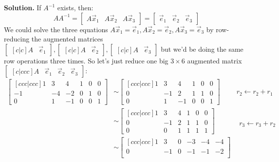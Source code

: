 \documentclass[11pt, letterpaper]{report}
\newenvironment{book}{}{}
\begin{document}
\begin{book}
\textbf{Solution.} If $A^{-1}$ exists, then:
\[AA^{-1} = \begin{bmatrix}
A\vec{x}_1 & A\vec{x}_2 & A\vec{x}_3
\end{bmatrix} = \begin{bmatrix}
\vec{e}_1 & \vec{e}_2 & \vec{e}_3
\end{bmatrix}\]
We could solve the three equations $A\vec{x}_1=\vec{e}_1, A\vec{x}_2=\vec{e}_2, A\vec{x}_3= \vec{e}_3$ by row-reducing the augmented matrices $\begin{bmatrix}[c|c]
A & \vec{e}_{1}
\end{bmatrix}, \begin{bmatrix}[c|c]
A & \vec{e}_2
\end{bmatrix}, \begin{bmatrix}[c|c]
A & \vec{e}_3
\end{bmatrix}$ but we'd be doing the same row operations three times. So let's just reduce one big $3\times6$ augmented matrix $\begin{bmatrix}[c|ccc]
A &\vec{e}_1 & \vec{e}_2 & \vec{e}_3
\end{bmatrix}$:
\begin{align*}
\begin{bmatrix}[ccc|ccc]
1 & 3 & 4 & 1 & 0 & 0\\
-1 & -4 & -2&0& 1 & 0 \\
0 & 1 & -1 &0 & 0 & 1
\end{bmatrix}
&\sim \begin{bmatrix}[ccc|ccc]
1 & 3 & 4 & 1 & 0 & 0\\
0 & -1 & 2&1& 1 & 0 \\
0 & 1 & -1 &0 & 0 & 1
\end{bmatrix} &r_2 \leftarrow r_2+r_1  \\
&\sim \begin{bmatrix}[ccc|ccc]
1 & 3 & 4 & 1 & 0 & 0\\
0 & -1 & 2&1& 1 & 0 \\
0 & 0 & 1 &1 & 1 & 1
\end{bmatrix} &\begin{matrix}
\\ \\ r_3 \leftarrow r_3+r_2
\end{matrix} \\
&\sim \begin{bmatrix}[ccc|ccc]
1 & 3 & 0 & -3 & -4 & -4\\
0 & -1 & 0&-1& -1 & -2 \\

\end{bmatrix}
\end{align*}
\end{book}
\end{document}

